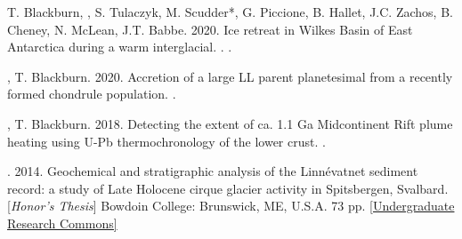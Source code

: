 \begin{etaremune} [itemsep=4pt, leftmargin=3ex]
    \item T. Blackburn, \ghedwards, S. Tulaczyk, M. Scudder*, G. Piccione, B. Hallet, J.C. Zachos, B. Cheney, N. McLean, J.T. Babbe. 2020. Ice retreat in Wilkes Basin of East Antarctica during a warm interglacial. . . 
    \item \ghedwards, T. Blackburn. 2020. Accretion of a large LL parent planetesimal from a recently formed chondrule population. . 
    \item \ghedwards, T. Blackburn. 2018. Detecting the extent of ca. 1.1 Ga Midcontinent Rift plume heating using U-Pb thermochronology of the lower crust. .  
    \item \ghedwards. 2014. Geochemical and stratigraphic analysis of the Linnévatnet sediment record: a study of Late Holocene cirque glacier activity in Spitsbergen, Svalbard. [\textit{Honor’s Thesis}] Bowdoin College: Brunswick, ME, U.S.A. 73 pp. \href{https://digitalcommons.bowdoin.edu/honorsprojects/12/}{[Undergraduate Research Commons]}
\end{etaremune}
